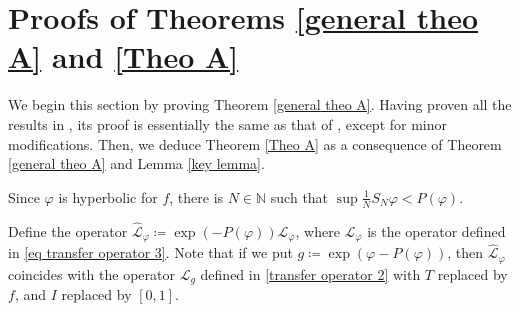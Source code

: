 \documentclass[10pt,a4paper]{amsart}
\numberwithin{equation}{section} %
\numberwithin{figure}{section} %
\newcommand{\N}{\mathbb{N}}
\renewcommand{\=}{\coloneqq}
\begin{document}
\section{Proofs of Theorems \ref{general theo A} and \ref{Theo A}}\label{sec: Proof of Theo B and C}
We begin this section by proving Theorem \ref{general theo A}. Having proven all the results in , its proof is essentially the same as that of \cite[Theorem B]{Juan1}, except for minor modifications. Then, we deduce Theorem \ref{Theo A} as a consequence of Theorem \ref{general theo A} and Lemma \ref{key lemma}.

Since $\varphi$ is hyperbolic for $f$, there is $N\in \N$ such that $\sup \frac{1}{N}S_N\varphi<P(\varphi)$. 

Define the operator $\widehat{\mathcal{L}}_\varphi \= \exp(-P(\varphi))\mathcal{L}_\varphi$, where $\mathcal{L}_{\varphi}$ is the operator defined in \eqref{eq transfer operator 3}. Note that if we put $g\=\exp(\varphi- P(\varphi))$, then $\widehat{\mathcal{L}}_\varphi$ coincides with the operator $\mathscr{L}_{g}$ defined in \eqref{transfer operator 2} with $T$ replaced by $f$, and $I$ replaced by $[0,1]$.
\end{document}

